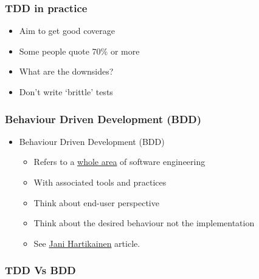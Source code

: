\hypertarget{tdd-in-practice}{%
\subsubsection{TDD in practice}\label{tdd-in-practice}}

\begin{itemize}
\tightlist
\item
  Aim to get good coverage
\item
  Some people quote 70\% or more
\item
  What are the downsides?
\item
  Don't write `brittle' tests
\end{itemize}

\hypertarget{behaviour-driven-development-bdd}{%
\subsubsection{Behaviour Driven Development
(BDD)}\label{behaviour-driven-development-bdd}}

\begin{itemize}
\tightlist
\item
  Behaviour Driven Development (BDD)

  \begin{itemize}
  \tightlist
  \item
    Refers to a
    \href{https://en.wikipedia.org/wiki/Behavior-driven_development}{whole
    area} of software engineering
  \item
    With associated tools and practices
  \item
    Think about end-user perspective
  \item
    Think about the desired behaviour not the implementation
  \item
    See
    \href{https://codeutopia.net/blog/2015/03/01/unit-testing-tdd-and-bdd/}{Jani
    Hartikainen} article.
  \end{itemize}
\end{itemize}

\hypertarget{tdd-vs-bdd}{%
\subsubsection{TDD Vs BDD}\label{tdd-vs-bdd}}

